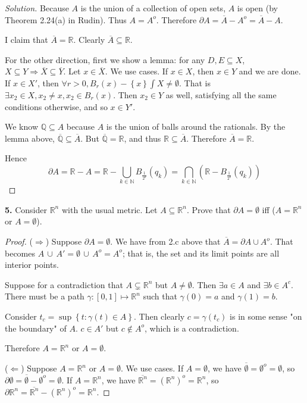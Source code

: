 \documentclass{article}
\newcommand{\R}{\mathbb{R}}
\newcommand{\N}{\mathbb{N}}
\newcommand{\Q}{\mathbb{Q}}
\newcommand{\set}[1]{\left\{ #1 \right\}}
\newcommand{\ol}[1]{\overline{#1}}
\newenvironment{solution}{\begin{proof}[Solution]}{\end{proof}}
\begin{document}
\begin{solution}
    Because $A$ is the union of a collection of open sets, $A$ is open (by Theorem 2.24(a) in Rudin). Thus $A = A^o$. Therefore $\partial A = \ol{A} - A^o = \ol{A} - A$.

    I claim that $\ol{A} = \R$. Clearly $\ol{A} \subseteq \R$.
    
    For the other direction, first we show a lemma: for any $D, E \subseteq X$, $X \subseteq Y \Rightarrow \ol{X} \subseteq \ol{Y}$. Let $x \in \ol{X}$. We use cases. If $x \in X$, then $x \in Y$ and we are done. If $x \in X'$, then $\forall r > 0, B_r(x) - \set{x} \int X \ne \emptyset$. That is $\exists x_2 \in X, x_2 \ne x, x_2 \in B_r(x)$. Then $x_2 \in Y$ as well, satisfying all the same conditions otherwise, and so $x \in Y'$.

    We know $\Q \subseteq A$ because $A$ is the union of balls around the rationals. By the lemma above, $\ol{\Q} \subseteq \ol A$. But $\ol{\Q} = \R$, and thus $\R \subseteq \ol A$. Therefore $\ol A = \R$.

    Hence
    $$\partial A = \R - A = \R - \bigcup_{k \in \N} B_{\frac{1}{2^k}}(q_k) = \bigcap_{k \in \N} (\R -  B_{\frac{1}{2^k}}(q_k))$$

\end{solution}

\newpage %

\textbf{5. } 
Consider $\R^n$ with the usual metric. Let $A \subseteq \R^n$. Prove that $\partial A = \emptyset$ iff ($A = \R^n$ or $A = \emptyset$).

\begin{proof}
    ($\Longrightarrow$) Suppose $\partial A = \emptyset$. We have from 2.c above that $\ol{A} = \partial A \cup A^o$. That becomes $A \, \cup\, A' = \emptyset\, \cup\, A^o = A^o$; that is, the set and its limit points are all interior points. 

    Suppose for a contradiction that $A \subsetneq \R^n$ but $A \ne \emptyset$. Then $\exists a \in A$ and $\exists b \in A^c$. 
    There must be a path $\gamma : [0, 1] \mapsto \R^n$ such that $\gamma(0) = a$ and $\gamma(1) = b$. 

    Consider $t_c = \sup\set{t: \gamma(t) \in A}$. Then clearly $c = \gamma(t_c)$ is in some sense "on the boundary" of $A$. 
    $c \in A'$ but $c \notin A^o$, which is a contradiction.

    Therefore $A = \R^n$ or $A = \emptyset$.

    ($\Longleftarrow$) Suppose $A = \R^n$ or $A = \emptyset$. We use cases. If $A = \emptyset$, we have $\ol{\emptyset} = \emptyset^o = \emptyset$, so $\partial\emptyset = \ol{\emptyset} - \emptyset^o = \emptyset$. If $A = \R^n$, we have $\ol{\R^n} = (\R^n)^o = \R^n$, so $\partial\R^n = \ol{\R^n} - (\R^n)^o = \R^n$.
\end{proof}
\end{document}
